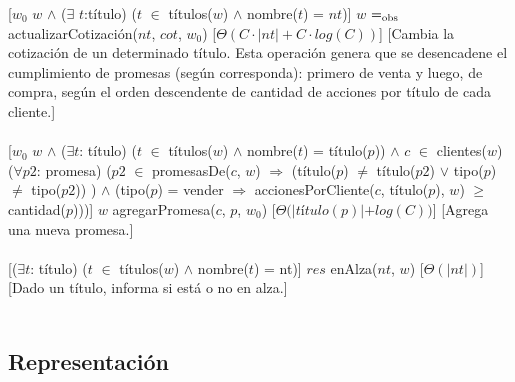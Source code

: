   [$w_{0}$ \igobs $w$ $\land$ ($\exists$ $t$:t\'itulo) ($t$ $\in$ t\'itulos($w$) $\land$ nombre($t$) = $nt$)]
  {$w$ $=_{\mathrm{obs}}$ actualizarCotizaci\'on($nt$, $cot$, $w_{0}$)}%
  [$\Theta(C \cdotp |nt|+C \cdotp log(C))$]
  [Cambia la cotizaci\'on de un determinado t\'itulo. Esta operaci\'on genera que se desencadene el cumplimiento de promesas (seg\'un corresponda): primero de venta y luego, de compra, seg\'un el orden descendente de cantidad de acciones por t\'itulo de cada cliente.]\\\\
  [$w_{0}$ \igobs $w$ $\land$ ($\exists$$t$: t\'itulo) ($t$ $\in$ t\'itulos($w$) $\land$ nombre($t$) = t\'itulo($p$)) $\land$ $c$ $\in$ clientes($w$) \yluego ($\forall$$p2$: promesa) ($p2$ $\in$ promesasDe($c$, $w$) $\Rightarrow$ (t\'itulo($p$) $\neq$ t\'itulo($p2$) $\lor$ tipo($p$) $\neq$ tipo($p2$)) ) $\land$ (tipo($p$) = vender $\Rightarrow$ accionesPorCliente($c$, t\'itulo($p$), $w$) $\geq$ cantidad($p$)))]
  {$w$ \igobs agregarPromesa($c$, $p$, $w_{0}$)}%
  [$\Theta(|t$\'i$tulo(p)| + log(C))$]
  [Agrega una nueva promesa.]\\\\
  [($\exists$$t$: t\'itulo) ($t$ $\in$ t\'itulos($w$) $\land$ nombre($t$) = nt)]
  {$res$ \igobs enAlza($nt$, $w$)}%
  [$\Theta(|nt|)$]
  [Dado un t\'itulo, informa si est\'a o no en alza.]\\\\


\subsection{Representaci\'on}
